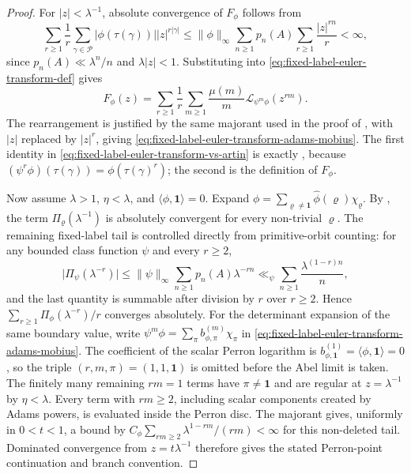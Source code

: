 \documentclass[11pt,a4paper]{amsart}
\theoremstyle{plain}
\theoremstyle{definition}
\theoremstyle{remark}
\newcommand{\cP}{\mathcal P}
\newcommand{\abs}[1]{\lvert #1 \rvert}
\newcommand{\norm}[1]{\lVert #1 \rVert}
\begin{document}
\begin{proof}
  For \(|z|<\lambda^{-1}\), absolute convergence of \(F_\phi\) follows
  from
  \[
    \sum_{r\ge1}\frac{1}{r}
      \sum_{\gamma\in\cP}\abs{\phi(\tau(\gamma))}|z|^{r|\gamma|}
    \le
    \norm{\phi}_\infty
    \sum_{n\ge1}p_n(A)\sum_{r\ge1}\frac{|z|^{rn}}{r}
    <\infty,
  \]
  since \(p_n(A)\ll\lambda^n/n\) and \(\lambda|z|<1\). Substituting
   into
  \eqref{eq:fixed-label-euler-transform-def} gives
  \[
    F_\phi(z)
    =
    \sum_{r\ge1}\frac{1}{r}
      \sum_{m\ge1}\frac{\mu(m)}{m}
        \mathcal L_{\psi^m\phi}(z^{rm}).
  \]
  The rearrangement is justified by the same majorant used in the proof
  of , with \(|z|\) replaced by
  \(|z|^r\), giving \eqref{eq:fixed-label-euler-transform-adams-mobius}.
  The first identity in
  \eqref{eq:fixed-label-euler-transform-vs-artin} is exactly
  , because
  \((\psi^r\phi)(\tau(\gamma))=\phi(\tau(\gamma)^r)\); the second is the
  definition of \(F_\phi\).

  Now assume \(\lambda>1\), \(\eta<\lambda\), and
  \(\langle\phi,\mathbf1\rangle=0\). Expand
  \(\phi=\sum_{\varrho\neq\mathbf1}\widehat\phi(\varrho)\chi_\varrho\).
  By , the term
  \(\Pi_\varrho(\lambda^{-1})\) is absolutely convergent for every
  non-trivial \(\varrho\).  The remaining fixed-label tail is controlled
  directly from primitive-orbit counting: for any bounded class function
  \(\psi\) and every \(r\ge2\),
  \[
    \abs{\Pi_\psi(\lambda^{-r})}
    \le
    \norm{\psi}_\infty\sum_{n\ge1}p_n(A)\lambda^{-rn}
    \ll_\psi
    \sum_{n\ge1}\frac{\lambda^{(1-r)n}}{n},
  \]
  and the last quantity is summable after division by \(r\) over
  \(r\ge2\). Hence \(\sum_{r\ge1}\Pi_\phi(\lambda^{-r})/r\) converges
  absolutely. For the determinant expansion of the same boundary value, write
  \(\psi^m\phi=\sum_\pi b_{\phi,
  \pi}^{(m)}\chi_\pi\) in
  \eqref{eq:fixed-label-euler-transform-adams-mobius}.  The coefficient of
  the scalar Perron logarithm is
  \(b_{\phi,\mathbf1}^{(1)}=\langle\phi,\mathbf1\rangle=0\), so the triple
  \((r,m,\pi)=(1,1,\mathbf1)\) is omitted before the Abel limit is taken.  The
  finitely many remaining \(rm=1\) terms have \(\pi\ne\mathbf1\) and are
  regular at \(z=\lambda^{-1}\) by \(\eta<\lambda\).  Every term with
  \(rm\ge2\), including scalar components created by Adams powers, is evaluated
  inside the Perron disc.  The majorant
   gives, uniformly in
  \(0<t<1\), a bound by
  \(C_\phi\sum_{rm\ge2}\lambda^{1-rm}/(rm)<\infty\) for this non-deleted tail.
  Dominated convergence from \(z=t\lambda^{-1}\) therefore gives the stated
  Perron-point continuation and branch convention.
\end{proof}
\end{document}

